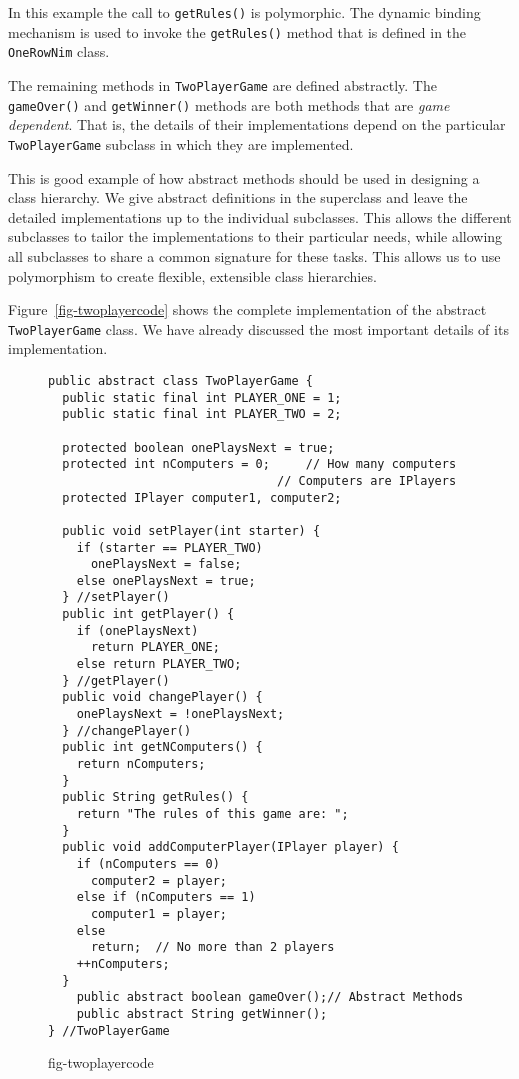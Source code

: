 \noindent In this example the call to {\tt getRules()} is polymorphic.
The dynamic binding mechanism is used to invoke the {\tt getRules()}
method that is defined in the {\tt OneRowNim} class.

The remaining methods in {\tt TwoPlayerGame} are defined abstractly.
The {\tt gameOver()} and {\tt getWinner()} methods are both methods
that are {\em game dependent}. That is, the details of their
implementations depend on the particular {\tt TwoPlayerGame} subclass
in which they are implemented.

This is good example of how abstract methods should be used in
designing a class hierarchy. We give abstract definitions in the
superclass and leave the detailed implementations up to the individual
subclasses.  This allows the different subclasses to tailor the
implementations to their particular needs, while allowing all
subclasses to share a common signature for these tasks.  This
allows us to use polymorphism to create flexible, extensible class
hierarchies.

Figure~\ref{fig-twoplayercode} shows the complete implementation of
the abstract {\tt TwoPlayerGame} class. We have already discussed the
most important details of its implementation.  


\begin{figure}[h!]
\jjjprogstart
\begin{jjjlisting}
\begin{lstlisting}
public abstract class TwoPlayerGame {   
  public static final int PLAYER_ONE = 1;
  public static final int PLAYER_TWO = 2;

  protected boolean onePlaysNext = true;
  protected int nComputers = 0;     // How many computers
                                // Computers are IPlayers
  protected IPlayer computer1, computer2; 
 
  public void setPlayer(int starter) {   
    if (starter == PLAYER_TWO)
      onePlaysNext = false;
    else onePlaysNext = true;
  } //setPlayer()
  public int getPlayer() {   
    if (onePlaysNext) 
      return PLAYER_ONE;
    else return PLAYER_TWO;
  } //getPlayer()
  public void changePlayer() {   
    onePlaysNext = !onePlaysNext;
  } //changePlayer()
  public int getNComputers() {
    return nComputers;
  }
  public String getRules() {
    return "The rules of this game are: ";
  }
  public void addComputerPlayer(IPlayer player) {
    if (nComputers == 0)
      computer2 = player;
    else if (nComputers == 1)
      computer1 = player;
    else 
      return;  // No more than 2 players
    ++nComputers;
  }
    public abstract boolean gameOver();// Abstract Methods
    public abstract String getWinner();
} //TwoPlayerGame
\end{lstlisting}
\end{jjjlisting}
{fig-twoplayercode}
\end{figure}


